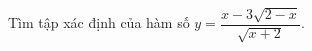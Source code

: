 \begin{ex}
Tìm tập xác định của hàm số $y=\dfrac{x-3\sqrt{2-x}}{\sqrt{x+2}}$.
\loigiai{Điều kiện: $2-x\ge0$ và $x+2>0\Leftrightarrow-2<x\le2$. Vậy $D=(-2;2]$.}
\end{ex}
